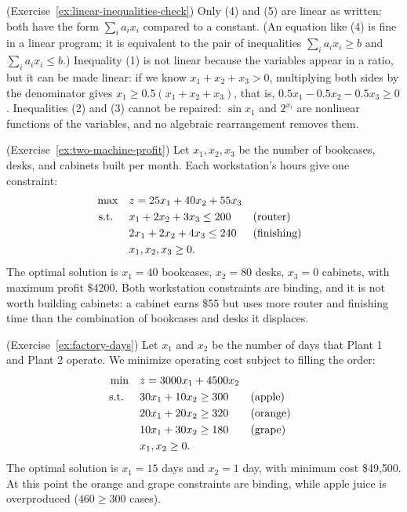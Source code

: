 \begin{solution}(Exercise~\ref{ex:linear-inequalities-check})
Only (4) and (5) are linear as written: both have the form $\sum_i a_i x_i$ compared to a constant.  (An equation like (4) is fine in a linear program; it is equivalent to the pair of inequalities $\sum_i a_i x_i \geq b$ and $\sum_i a_i x_i \leq b$.)
Inequality (1) is not linear because the variables appear in a ratio, but it can be made linear: if we know $x_1 + x_2 + x_3 > 0$, multiplying both sides by the denominator gives $x_1 \geq 0.5(x_1 + x_2 + x_3)$, that is, $0.5x_1 - 0.5x_2 - 0.5x_3 \geq 0$.
Inequalities (2) and (3) cannot be repaired: $\sin x_1$ and $2^{x_i}$ are nonlinear functions of the variables, and no algebraic rearrangement removes them.
\end{solution}

\begin{solution}(Exercise~\ref{ex:two-machine-profit})
Let $x_1, x_2, x_3$ be the number of bookcases, desks, and cabinets built per month.  Each workstation's hours give one constraint:
\begin{align*}
\max \quad & z = 25x_1 + 40x_2 + 55x_3\\
\mbox{ s.t. } \quad & x_1 + 2x_2 + 3x_3 \leq 200 && \mbox{(router)}\\
& 2x_1 + 2x_2 + 4x_3 \leq 240 && \mbox{(finishing)}\\
& x_1, x_2, x_3 \geq 0.
\end{align*}
The optimal solution is $x_1 = 40$ bookcases, $x_2 = 80$ desks, $x_3 = 0$ cabinets, with maximum profit \$4200.  Both workstation constraints are binding, and it is not worth building cabinets: a cabinet earns \$55 but uses more router and finishing time than the combination of bookcases and desks it displaces.
\end{solution}

\begin{solution}(Exercise~\ref{ex:factory-days})
Let $x_1$ and $x_2$ be the number of days that Plant 1 and Plant 2 operate.  We minimize operating cost subject to filling the order:
\begin{align*}
\min \quad & z = 3000x_1 + 4500x_2\\
\mbox{ s.t. } \quad & 30x_1 + 10x_2 \geq 300 && \mbox{(apple)}\\
& 20x_1 + 20x_2 \geq 320 && \mbox{(orange)}\\
& 10x_1 + 30x_2 \geq 180 && \mbox{(grape)}\\
& x_1, x_2 \geq 0.
\end{align*}
The optimal solution is $x_1 = 15$ days and $x_2 = 1$ day, with minimum cost \$49{,}500.  At this point the orange and grape constraints are binding, while apple juice is overproduced ($460 \geq 300$ cases).
\end{solution}

